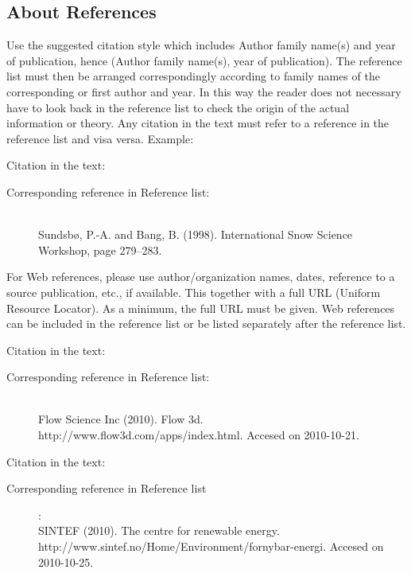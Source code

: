 \documentclass[a4paper,12pt]{extarticle}
\begin{document}
\subsection{About References}
Use the suggested citation style which includes Author family name(s) and year of publication, hence (Author family name(s), year of publication). The reference list must then be arranged correspondingly according to family names of the corresponding or first author and year. In this way the reader does not necessary have to look back in the reference list to check the origin of the actual information or theory. Any citation in the text must refer to a reference in the reference list and visa versa. Example:

\begin{description}
    \item[Citation in the text:] \citet{Sundsbo1998}
    \item[Corresponding reference in Reference list:] \hfill \\ Sundsbø, P.-A. and Bang, B. (1998). International Snow Science Workshop, page 279–283.
\end{description}

For Web references, please use author/organization names, dates, reference to a source publication, etc., if available. This together with a full URL (Uniform Resource Locator). As a minimum, the full URL must be given. Web references can be included in the reference list or be listed separately after the reference list.

\begin{description}
  \item[Citation in the text:] \citet{FlowScienceInc2010}
  \item[Corresponding reference in Reference list:] \hfill \\ Flow Science Inc (2010). Flow 3d. http://www.flow3d.com/apps/index.html. Accesed on 2010-10-21.
\end{description}

\begin{description}
  \item[Citation in the text:] \citet{SINTEF2010}
  \item[Corresponding reference in Reference list]: \hfill \\ SINTEF (2010). The centre for renewable energy. http://www.sintef.no/Home/Environment/fornybar-energi. Accesed on 2010-10-25.
\end{description}
\end{document}
